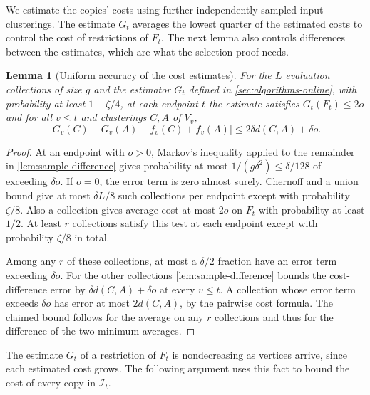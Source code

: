 \documentclass[11pt]{article}
\newtheorem{lemma}[theorem]{Lemma}
\begin{document}
We estimate the copies' costs using further independently sampled input
clusterings. The estimate $G_t$
averages the lowest quarter of the estimated costs to control the cost of restrictions
of $F_t$. The next lemma also controls differences between the estimates,
which are what the selection proof needs.

\begin{lemma}[Uniform accuracy of the cost estimates]\label{lem:online-eval}
For the $L$ evaluation collections of size $g$ and the estimator $G_t$
defined in \cref{sec:algorithms-online}, with
probability at least $1-\zeta/4$, at each endpoint $t$ the estimate
satisfies $G_t(F_t)\le2o$ and for all $v\le t$ and clusterings
$C,A$ of $V_v$,
\[
 |G_v(C)-G_v(A)-f_v(C)+f_v(A)|\le 2\delta d(C,A)+\delta o .
\]
\end{lemma}
\begin{proof}
At an endpoint with $o>0$, Markov's inequality applied to the
remainder in \cref{lem:sample-difference} gives probability at
most $1/(g\delta^2)\le\delta/128$ of exceeding $\delta o$. If $o=0$,
the error term is zero almost surely. Chernoff and a union bound give at most
$\delta L/8$ such collections per endpoint except with probability
$\zeta/8$. Also a collection gives average cost at most $2o$ on $F_t$ with
probability at least $1/2$. At least $r$ collections satisfy this test
at each endpoint except with probability $\zeta/8$ in total.

Among any $r$ of these collections, at most a $\delta/2$ fraction have
an error term exceeding $\delta o$. For the other collections \cref{lem:sample-difference}
bounds the cost-difference error by $\delta d(C,A)+\delta o$
at every $v\le t$. A collection whose error term exceeds $\delta o$ has error at most
$2d(C,A)$, by the pairwise cost formula. The claimed bound follows
for the average on any $r$ collections and thus for the difference of
the two minimum averages.
\end{proof}

The estimate $G_t$ of a restriction of $F_t$ is nondecreasing as vertices arrive, since
each estimated cost grows. The following argument uses this fact
to bound the cost of every copy in $\mathcal I_t$.
\end{document}
